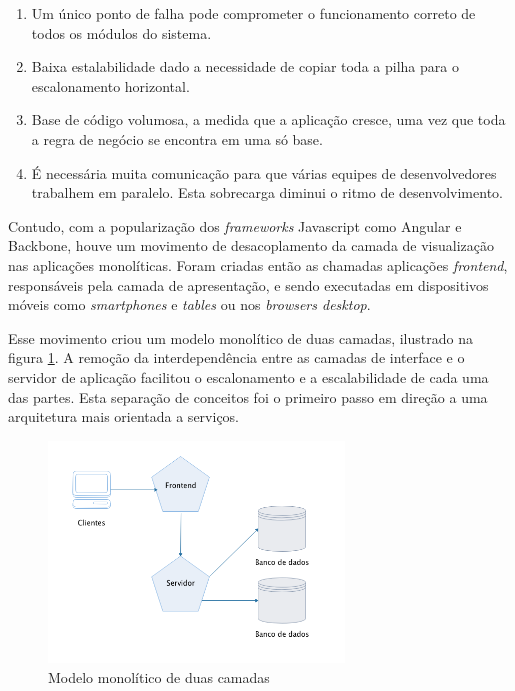 \begin{enumerate}[label=\alph*]
    \item Um único ponto de falha pode comprometer o funcionamento correto de todos os módulos do sistema.
    \item Baixa estalabilidade dado a necessidade de copiar toda a pilha para o escalonamento horizontal.
    \item Base de código volumosa, a medida que a aplicação cresce, uma vez que toda a regra de negócio se encontra em uma só base.
    \item É necessária muita comunicação para que várias equipes de desenvolvedores trabalhem em paralelo. Esta sobrecarga diminui o ritmo de desenvolvimento.
\end{enumerate}

Contudo, com a popularização dos \textit{frameworks} Javascript como Angular e Backbone, houve um movimento de desacoplamento da camada de visualização nas aplicações monolíticas. Foram criadas então as chamadas aplicações \textit{frontend}, responsáveis pela camada de apresentação, e sendo executadas em dispositivos móveis como \textit{smartphones} e \textit{tables} ou nos \textit{browsers desktop}. 

Esse movimento criou um modelo monolítico de duas camadas, ilustrado na figura \ref{fig:two-tier-monolithic}. A remoção da interdependência entre as camadas de interface e o servidor de aplicação facilitou o escalonamento e a escalabilidade de cada uma das partes. Esta separação de conceitos foi o primeiro passo em direção a uma arquitetura mais orientada a serviços.

\begin{figure}[htbp]
    \centering
    \includegraphics[width=0.7\textwidth]{figuras/monolithic-2-tier.png}
    \caption{Modelo monolítico de duas camadas}
    \label{fig:two-tier-monolithic}
\end{figure}

